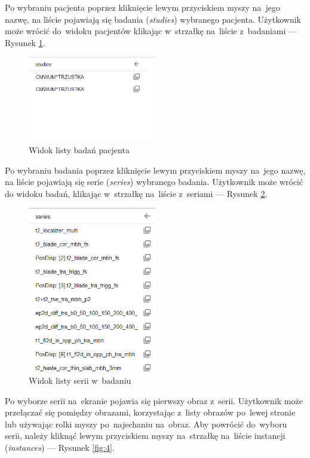 \documentclass[a4paper,11pt,twoside,openright]{report}
\theoremstyle{definition}
\begin{document}
Po wybraniu pacjenta poprzez kliknięcie lewym przyciskiem myszy na~jego nazwę,
na liście pojawiają się badania (\textit{studies}) wybranego pacjenta. Użytkownik może
wrócić do~widoku pacjentów klikając w~strzałkę na~liście z~badaniami --- Rysunek \ref{fig:2}.

\begin{figure}[h!]
	\center
	\includegraphics[width=0.5\textwidth]{2}
	\caption{Widok listy badań pacjenta}
    	\label{fig:2}
\end{figure}

\pagebreak

Po wybraniu badania poprzez kliknięcie lewym przyciskiem myszy na~jego nazwę,
na liście pojawiają się serie (\textit{series}) wybranego badania. Użytkownik może wrócić
do widoku badań, klikając w~strzałkę na~liście z~seriami --- Rysunek \ref{fig:3}.

\begin{figure}[h!]
	\center
	\includegraphics[width=0.5\textwidth]{3}
	\caption{Widok listy serii w~badaniu}
    	\label{fig:3}
\end{figure}

Po wyborze serii na~ekranie pojawia się pierwszy obraz z~serii. Użytkownik
może przełączać się pomiędzy obrazami, korzystając z~listy obrazów po~lewej
stronie lub używając rolki myszy po~najechaniu na~obraz. Aby powrócić do~wyboru
serii, należy kliknąć lewym przyciskiem myszy na~strzałkę na~liście instancji
(\textit{instances}) --- Rysunek \ref{fig:4}.
\end{document}
